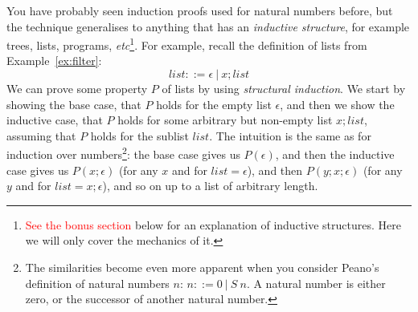 \documentclass{tufte-handout}
\newcounter{example}
\newcommand{\RED}[1]{\textcolor{red}{#1}}
\begin{document}
You have probably seen induction proofs used for natural numbers
before, but the technique generalises to anything that has an
\emph{inductive structure}, for example trees, lists, programs,
\emph{etc}\footnote{\RED{See the bonus section} below for an
  explanation of inductive structures. Here we will only cover the
  mechanics of it.}. For example, recall the definition of lists
from Example~\ref{ex:filter}:
\[
  \mathit{list} ::= \epsilon ~|~ x; \mathit{list}
\]
We can prove some property $P$ of lists by using \emph{structural
  induction}. We start by showing the base case, that $P$ holds
for the empty list $\epsilon$, and then we show the inductive
case, that $P$ holds for some arbitrary but non-empty list
$x;\mathit{list}$, assuming that $P$ holds for the sublist
$\mathit{list}$.
%
The intuition is the same as for induction over
numbers\footnote{The similarities become even more apparent when
  you consider Peano's definition of natural numbers $n$:
  $n ::= 0 ~|~ S~n$. A natural number is either zero, or the
  successor of another natural number. }: the base case gives us
$P(\epsilon)$, and then the inductive case gives us
$P(x;\epsilon)$ (for any $x$ and for $\mathit{list} = \epsilon$),
and then $P(y;x;\epsilon)$ (for any $y$ and for
$\mathit{list} = x;\epsilon$), and so on up to a list of arbitrary
length.
\end{document}
